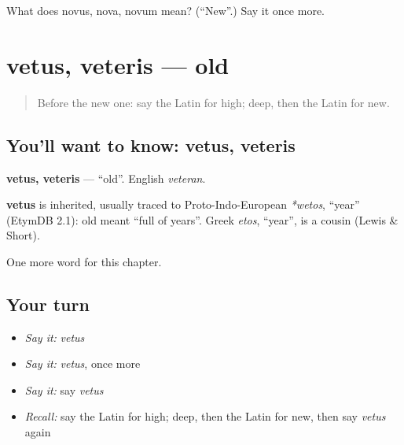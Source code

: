 \begin{tcolorbox}[breakable,colback=teal!4,colframe=teal!35!black,title={Before you move on}]
What does novus, nova, novum mean? (\textquotedblleft{}New\textquotedblright{}.) Say it once more.
\end{tcolorbox}
\section[vetus, veteris]{vetus, veteris — old}

\label{lesson:LA-C94-vetus}



\begin{quote}
Before the new one: say the Latin for high; deep, then the Latin for new.
\end{quote}

\subsection*{You'll want to know: vetus, veteris}
\textbf{vetus, veteris} — \textquotedblleft{}old\textquotedblright{}. English \emph{veteran}.

\begin{cousinweb}
\textbf{vetus} is inherited, usually traced to Proto-Indo-European \emph{*wetos}, \textquotedblleft{}year\textquotedblright{} (EtymDB 2.1): old meant \textquotedblleft{}full of years\textquotedblright{}. Greek \emph{etos}, \textquotedblleft{}year\textquotedblright{}, is a cousin (Lewis \& Short).
\end{cousinweb}

\begin{grammarlens}[title={What you've built}]
One more word for this chapter.
\end{grammarlens}

\subsection*{Your turn}
\begin{itemize}
\raggedright
  \item \emph{Say it:} \emph{vetus}
  \item \emph{Say it:} \emph{vetus}, once more
  \item \emph{Say it:} say \emph{vetus}
  \item \emph{Recall:} say the Latin for high; deep, then the Latin for new, then say \emph{vetus} again
\end{itemize}

